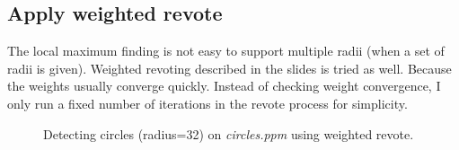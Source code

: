 \documentclass[paper=a4, fontsize=11pt]{scrartcl}
\begin{document}
\subsection{Apply weighted revote}

The local maximum finding is not easy to support multiple radii (when a set of radii is given).
Weighted revoting described in the slides is tried as well.
Because the weights usually converge quickly.
Instead of checking weight convergence, I only run a fixed number of iterations in the revote process for simplicity.

\begin{figure}[h]
\centering
{}
\caption{Detecting circles (radius=32) on \emph{circles.ppm} using weighted revote.}
\label{fig:hough:simple_circle:32:weighted_vote}
\end{figure}
\end{document}
